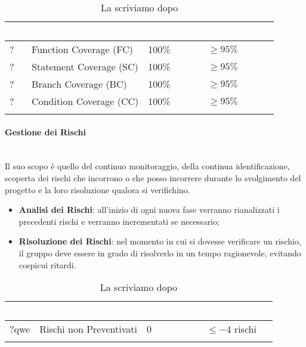 \begin{longtable}{|C{.15\textwidth}|C{.24\textwidth}|C{.24\textwidth}|C{.24\textwidth}|}
\hline
{}\textbf{\textcolor{white}{ID}} & \textbf{\textcolor{white}{Nome}} & \textbf{\textcolor{white}{Ottimalità}} & \textbf{\textcolor{white}{Accettabilità}}\\
\hline \hline
\endfirsthead
? & Function Coverage (FC) & 100\% & $\geqslant 95\%$ \\
\hline
\hline
{} ? & Statement Coverage (SC) & 100\% & $\geqslant 95\%$ \\
\hline
? & Branch Coverage (BC) & 100\% & $\geqslant 95\%$ \\
\hline
{}? & Condition Coverage (CC) & 100\% & $\geqslant 95\%$ \\
\hline
\caption{La scriviamo dopo}
\label{La scriviamo dopo}
\end{longtable}

\paragraph{Gestione dei Rischi}\-\\
Il suo scopo è quello del continuo monitoraggio, della continua identificazione, scoperta dei rischi che incorrono o che posso incorrere durante lo svolgimento del progetto e la loro risoluzione qualora si verifichino. 
\begin{itemize}
	\item \textbf{Analisi dei Rischi}: all'inizio di ogni nuova fase verranno rianalizzati i precedenti rischi e verranno incrementati se necessario;
	\item \textbf{Risoluzione dei Rischi}: nel momento in cui si dovesse verificare un rischio, il gruppo deve essere in grado di risolverlo in un tempo ragionevole, evitando cospicui ritardi.
\end{itemize}

\begin{longtable}{|C{.15\textwidth}|C{.24\textwidth}|C{.24\textwidth}|C{.24\textwidth}|}
\hline
{}\textbf{\textcolor{white}{ID}} & \textbf{\textcolor{white}{Nome}} & \textbf{\textcolor{white}{Ottimalità}} & \textbf{\textcolor{white}{Accettabilità}}\\
\hline \hline
\endfirsthead
?qwe & Rischi non Preventivati & 0 & $ \leqslant -4$ rischi \\
\hline
\caption{La scriviamo dopo}
\label{La scriviamo dopo}
\end{longtable}

